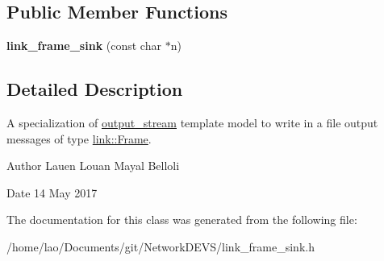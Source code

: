 \subsection*{Public Member Functions}
\begin{DoxyCompactItemize}
\item 
{\bfseries link\+\_\+frame\+\_\+sink} (const char $\ast$n)\hypertarget{classlink__frame__sink_a34ab220d2e602bf129b3ca2ca893f00f}{}\label{classlink__frame__sink_a34ab220d2e602bf129b3ca2ca893f00f}

\end{DoxyCompactItemize}


\subsection{Detailed Description}
A specialization of \hyperlink{classoutput__stream}{output\+\_\+stream} template model to write in a file output messages of type \hyperlink{structlink_1_1Frame}{link\+::\+Frame}. 

\begin{DoxyAuthor}{Author}
Lauen Louan Mayal Belloli 
\end{DoxyAuthor}
\begin{DoxyDate}{Date}
14 May 2017 
\end{DoxyDate}


The documentation for this class was generated from the following file\+:\begin{DoxyCompactItemize}
\item 
/home/lao/\+Documents/git/\+Network\+D\+E\+V\+S/link\+\_\+frame\+\_\+sink.\+h\end{DoxyCompactItemize}
